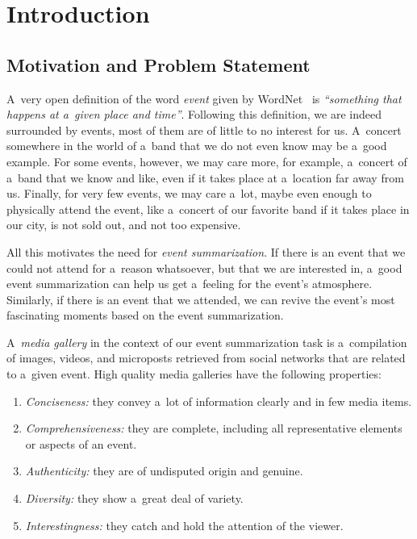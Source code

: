 \chapter{Introduction}
\label{cha:introduction}

\ifpdf
    \graphicspath{{1_introduction/figures/PNG/}{1_introduction/figures/PDF/}{1_introduction/figures/}}
\else
    \graphicspath{{1_introduction/figures/EPS/}{1_introduction/figures/}}
\fi

\section{Motivation and Problem Statement}

A~very open definition of the word \emph{event}
given by WordNet~\cite{fellbaum1998wordnet,miller1995wordnet} is
\emph{``something that happens at a~given place and time''}.
Following this definition,
we are indeed surrounded by events, most of them
are of little to no interest for us.
A~concert somewhere in the world of a~band
that we do not even know may be a~good example.
For some events, however, we may care more, for example,
a~concert of a~band that we know and like,
even if it takes place at a~location far away from us.
Finally, for very few events, we may care a~lot,
maybe even enough to physically attend the event,
like a~concert of our favorite band
if it takes place in our city, is not sold out,
and not too expensive.

All this motivates the need for \emph{event summarization}.
If there is an event that we could not attend
for a~reason whatsoever,
but that we are interested in,
a~good event summarization can help us get a~feeling
for the event's atmosphere.
Similarly, if there is an event that we attended,
we can revive the event's most fascinating moments
based on the event summarization.

A~\emph{media gallery} in the context of
our event summarization task is
a~compilation of images, videos,
and microposts retrieved from social networks
that are related to a~given event.
High quality media galleries have the following properties:

\begin{enumerate}
  \item \textit{Conciseness:}
        they convey a~lot of information clearly
        and in few media items.
  \item \textit{Comprehensiveness:}
        they are complete, including all representative
        elements or aspects of an event.
  \item \textit{Authenticity:}
        they are of undisputed origin and genuine.
  \item \textit{Diversity:}
        they show a~great deal of variety.
  \item \textit{Interestingness:}
        they catch and hold the attention of the viewer.     
\end{enumerate}

